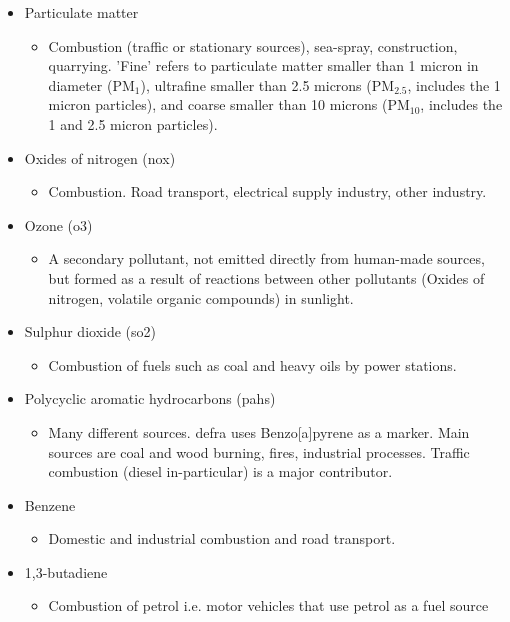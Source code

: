 \begin{itemize}
\item Particulate matter
\begin{itemize}
\item Combustion (traffic or stationary sources), sea-spray, construction, quarrying. 'Fine' refers to particulate matter smaller than 1 micron in diameter (PM$_{1}$), ultrafine smaller than 2.5 microns (PM$_{2.5}$, includes the 1 micron particles), and coarse smaller than 10 microns (PM$_{10}$, includes the 1 and 2.5 micron particles).
\end{itemize}
\item Oxides of nitrogen (\gls{nox})
\begin{itemize}
\item Combustion. Road transport, electrical supply industry, other industry.
\end{itemize}
\item Ozone (\gls{o3})
\begin{itemize}
\item A secondary pollutant, not emitted directly from human-made sources, but formed as a result of reactions between other pollutants (Oxides of nitrogen, volatile organic compounds) in sunlight.
\end{itemize}
\item Sulphur dioxide (\gls{so2})
\begin{itemize}
\item Combustion of fuels such as coal and heavy oils by power stations.
\end{itemize}
\item Polycyclic aromatic hydrocarbons (\gls{pahs}) 
\begin{itemize}
\item Many different sources. \gls{defra} uses Benzo[a]pyrene as a marker. Main sources are coal and wood burning, fires, industrial processes. Traffic combustion (diesel in-particular) is a major contributor.
\end{itemize}
\item Benzene
\begin{itemize}
\item Domestic and industrial combustion and road transport.
\end{itemize}
\item 1,3-butadiene
\begin{itemize}
\item Combustion of petrol i.e. motor vehicles that use petrol as a fuel source
\end{itemize}

\end{itemize}
